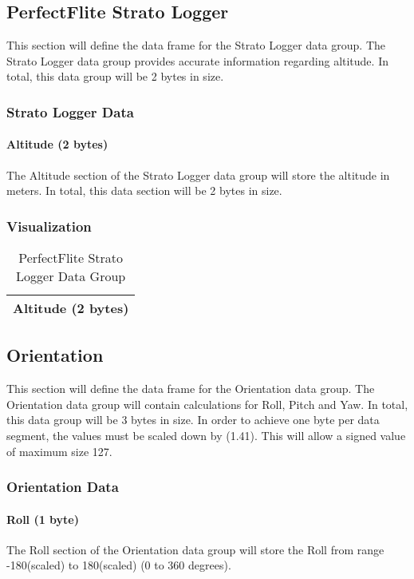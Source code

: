 \documentclass{article}
\begin{document}
 \pagebreak
 
  \subsection{PerfectFlite Strato Logger}
  This section will define the data frame for the Strato Logger data group. The Strato Logger data group provides accurate information regarding altitude. In total, this data group will be 2 bytes in size.
  \subsubsection{Strato Logger Data}
  \paragraph{Altitude (2 bytes)}
  The Altitude section of the Strato Logger data group will store the altitude in meters. In total, this data section will be 2 bytes in size.
  
  \subsubsection{Visualization}
  \begin{table}[H]
  \centering
  \caption{PerfectFlite Strato Logger Data Group}
  \label{my-label}
  \begin{tabular}{|l|}
  \hline
Altitude (2 bytes) \\ \hline
 \end{tabular}
 \end{table}
  
 \pagebreak
  
  \subsection{Orientation}
  This section will define the data frame for the Orientation data group. The Orientation data group will contain calculations for Roll, Pitch and Yaw. In total, this data group will be 3 bytes in size. In order to achieve one byte per data segment, the values must be scaled down by (1.41). This will allow a signed value of maximum size 127.
  \subsubsection{Orientation Data}
  \paragraph{Roll (1 byte)}
  The Roll section of the Orientation data group will store the Roll from range -180(scaled) to 180(scaled) (0 to 360 degrees).
\end{document}
